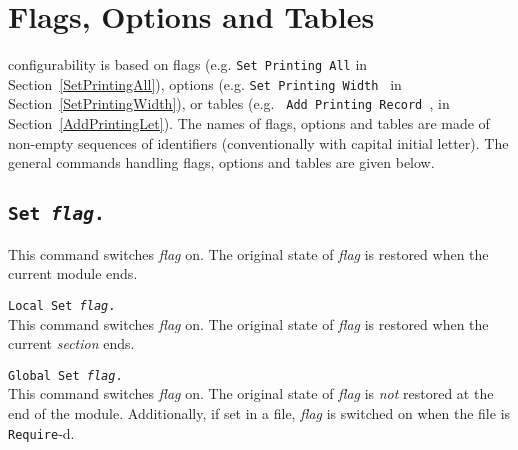 
\section{Flags, Options and Tables}

{\Coq} configurability is based on flags (e.g. {\tt Set Printing All} in
Section~\ref{SetPrintingAll}), options (e.g. {\tt Set Printing Width
  {\integer}} in Section~\ref{SetPrintingWidth}), or tables (e.g. {\tt
  Add Printing Record {\ident}}, in Section~\ref{AddPrintingLet}). The
names of flags, options and tables are made of non-empty sequences of
identifiers (conventionally with capital initial letter). The general
commands handling flags, options and tables are given below.

\subsection[\tt Set {\rm\sl flag}.]{\tt Set {\rm\sl flag}.}
This command switches {\rm\sl flag} on. The original state of
{\rm\sl flag} is restored when the current module ends.

\begin{Variants}
\item {\tt Local Set {\rm\sl flag}.}\\
This command switches {\rm\sl flag} on. The original state of
{\rm\sl flag} is restored when the current \emph{section} ends.
\item {\tt Global Set {\rm\sl flag}.}\\
This command switches {\rm\sl flag} on. The original state of
{\rm\sl flag} is \emph{not} restored at the end of the module. Additionally,
if set in a file, {\rm\sl flag} is switched on when the file is
{\tt Require}-d.
\end{Variants}

